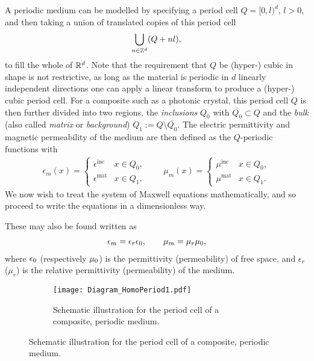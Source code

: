 A periodic medium can be modelled by specifying a period cell $Q=[0,l)^d$, $l>0$, and then taking a union of translated copies of this period cell
\begin{align*}
	\bigcup_{n\in\mathbb{Z}^d} (Q + nl),
\end{align*}
to fill the whole of $\mathbb{R}^d$.
Note that the requirement that $Q$ be (hyper-) cubic in shape is not restrictive, as long as the material is periodic in $d$ linearly independent directions one can apply a linear transform to produce a (hyper-) cubic period cell.
For a composite such as a photonic crystal, this period cell $Q$ is then further divided into two regions, the \emph{inclusions} $Q_0$ with $\overline{Q_0}\subset Q$ and the \emph{bulk} (also called \emph{matrix} or \emph{background}) $Q_1:=Q\setminus \overline{Q_0}$.
The electric permittivity and magnetic permeability of the medium are then defined as the $Q$-periodic functions with
\begin{align*}
	\epsilon_m(x) = \begin{cases} \epsilon^{\mathrm{inc}} & x\in Q_0, \\ \epsilon^{\mathrm{mat}} & x\in Q_1, \end{cases}
	\qquad
	\mu_m(x) = \begin{cases} \mu^{\mathrm{inc}} & x\in Q_0, \\ \mu^{\mathrm{mat}} & x\in Q_1. \end{cases}
\end{align*}
We now wish to treat the system of Maxwell equations mathematically, and so proceed to write the equations in a dimensionless way.

These may also be found written as
\begin{align*}
	\epsilon_{m} = \epsilon_{r}\epsilon_0, \qquad \mu_{m} = \mu_{r}\mu_0,
\end{align*}
where $\epsilon_0$ (respectively $\mu_0$) is the permittivity (permeability) of free space, and $\epsilon_{r}$ ($\mu_{r}$) is the relative permittivity (permeability) of the medium.
\begin{figure}[t]
	\centering
	\begin{subfigure}[t]{0.3\textwidth}
		\centering
		\texttt{[image: Diagram\_HomoPeriod1.pdf]}
		\caption{\label{fig:Diagram_HomoPeriod1} Schematic illustration for the period cell of a composite, periodic medium.}
	\end{subfigure}
\end{figure}


